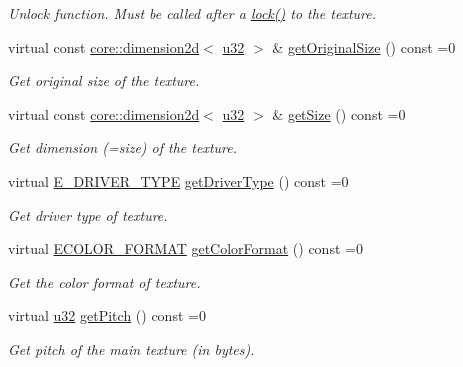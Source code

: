 \begin{DoxyCompactItemize}
\begin{DoxyCompactList}\small\item\em Unlock function. Must be called after a \hyperlink{classirr_1_1video_1_1ITexture_aa09ee89973a645ebdd2bd61ed859df38}{lock()} to the texture. \end{DoxyCompactList}\item 
virtual const \hyperlink{classirr_1_1core_1_1dimension2d}{core\+::dimension2d}$<$ \hyperlink{namespaceirr_a0416a53257075833e7002efd0a18e804}{u32} $>$ \& \hyperlink{classirr_1_1video_1_1ITexture_adbb05bcee8ec7fa11bb4ccfdb725cda8}{get\+Original\+Size} () const =0
\begin{DoxyCompactList}\small\item\em Get original size of the texture. \end{DoxyCompactList}\item 
virtual const \hyperlink{classirr_1_1core_1_1dimension2d}{core\+::dimension2d}$<$ \hyperlink{namespaceirr_a0416a53257075833e7002efd0a18e804}{u32} $>$ \& \hyperlink{classirr_1_1video_1_1ITexture_adfcf9558c0f1ae543782c03f7903c48e}{get\+Size} () const =0
\begin{DoxyCompactList}\small\item\em Get dimension (=size) of the texture. \end{DoxyCompactList}\item 
virtual \hyperlink{namespaceirr_1_1video_ae35a6de6d436c76107ad157fe42356d0}{E\+\_\+\+D\+R\+I\+V\+E\+R\+\_\+\+T\+Y\+PE} \hyperlink{classirr_1_1video_1_1ITexture_a4c6abdc0c789e6022e4e1b8a06cfab71}{get\+Driver\+Type} () const =0
\begin{DoxyCompactList}\small\item\em Get driver type of texture. \end{DoxyCompactList}\item 
virtual \hyperlink{namespaceirr_1_1video_a1d5e487888c32b1674a8f75116d829ed}{E\+C\+O\+L\+O\+R\+\_\+\+F\+O\+R\+M\+AT} \hyperlink{classirr_1_1video_1_1ITexture_a48bbc0208c046724fc3264406f774132}{get\+Color\+Format} () const =0
\begin{DoxyCompactList}\small\item\em Get the color format of texture. \end{DoxyCompactList}\item 
virtual \hyperlink{namespaceirr_a0416a53257075833e7002efd0a18e804}{u32} \hyperlink{classirr_1_1video_1_1ITexture_a14fd1eba217a0dd86b40c4d792ab14ea}{get\+Pitch} () const =0
\begin{DoxyCompactList}\small\item\em Get pitch of the main texture (in bytes). \end{DoxyCompactList}\item 

\end{DoxyCompactItemize}
